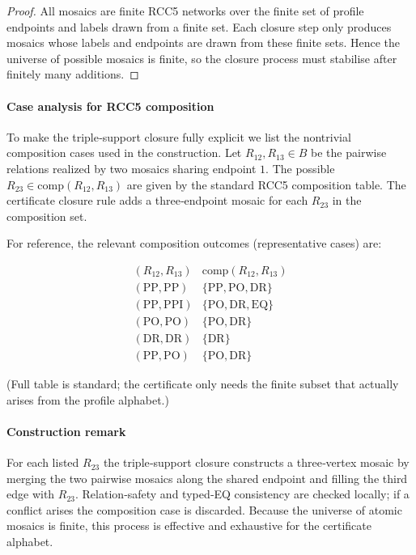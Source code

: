 \documentclass[11pt]{article}
\newcommand{\PP}{\mathrm{PP}}
\newcommand{\PPI}{\mathrm{PPI}}
\newcommand{\EQ}{\mathrm{EQ}}
\newcommand{\DR}{\mathrm{DR}}
\newcommand{\PO}{\mathrm{PO}}
\begin{document}
\begin{proof}
All mosaics are finite RCC5 networks over the finite set of profile endpoints and labels drawn from a finite set. Each closure step only produces mosaics whose labels and endpoints are drawn from these finite sets. Hence the universe of possible mosaics is finite, so the closure process must stabilise after finitely many additions.
\end{proof}


\paragraph{Case analysis for RCC5 composition}
To make the triple‑support closure fully explicit we list the nontrivial
composition cases used in the construction. Let $R_{12},R_{13}\in B$ be the
pairwise relations realized by two mosaics sharing endpoint $1$. The possible
$R_{23}\in\mathrm{comp}(R_{12},R_{13})$ are given by the standard RCC5
composition table. The certificate closure rule adds a three‑endpoint mosaic
for each $R_{23}$ in the composition set.

For reference, the relevant composition outcomes (representative cases) are:


\[
\begin{array}{c|c}
(R_{12},R_{13}) & \mathrm{comp}(R_{12},R_{13}) \\
\hline
(\PP,\PP) & \{\PP,\mathrm{PO},\mathrm{DR}\} \\
(\PP,\PPI) & \{\mathrm{PO},\mathrm{DR},\EQ\} \\
(\PO,\PO) & \{\PO,\mathrm{DR}\} \\
(\DR,\DR) & \{\DR\} \\
(\PP,\PO) & \{\PO,\mathrm{DR}\}
\end{array}
\]


(Full table is standard; the certificate only needs the finite subset that
actually arises from the profile alphabet.)

\paragraph{Construction remark}
For each listed $R_{23}$ the triple‑support closure constructs a three‑vertex
mosaic by merging the two pairwise mosaics along the shared endpoint and
filling the third edge with $R_{23}$. Relation‑safety and typed‑EQ
consistency are checked locally; if a conflict arises the composition case is
discarded. Because the universe of atomic mosaics is finite, this process is
effective and exhaustive for the certificate alphabet.
\end{document}
